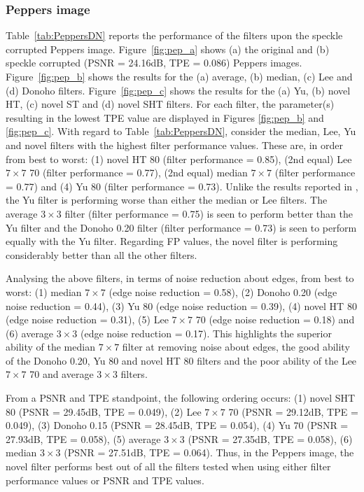 \documentclass[12pt]{report}
\begin{document}
\subsubsection{Peppers image}
Table~\ref{tab:PeppersDN} reports the performance of the filters upon the speckle corrupted Peppers image.
Figure~\ref{fig:pep_a} shows (a) the original and (b) speckle corrupted (PSNR = 24.16dB, TPE = 0.086) Peppers images.
Figure~\ref{fig:pep_b} shows the results for the (a) average, (b) median, (c) Lee and (d) Donoho filters. 
Figure~\ref{fig:pep_c} shows the results for the (a) Yu, (b) novel HT, (c) novel ST and (d) novel SHT filters.
For each filter, the parameter(s) resulting in the lowest TPE value are displayed in Figures \ref{fig:pep_b} and \ref{fig:pep_c}.
With regard to Table~\ref{tab:PeppersDN}, consider the median, Lee, Yu and novel filters with the highest
filter performance values. These are, in order from best to worst: (1) novel HT 80 (filter performance = 0.85), (2nd equal) Lee $7 \times 7$ 70 
(filter performance = 0.77),
(2nd equal) median $7 \times 7$ (filter performance = 0.77) and (4) Yu 80 (filter performance = 0.73). 
Unlike the results reported in \cite{yu96}, the Yu
filter is performing worse than either the median or Lee filters. The average $3 \times 3$ filter (filter performance = 0.75) is seen
to perform better than the Yu filter and the Donoho 0.20 filter (filter performance = 0.73) is seen to perform equally with the Yu filter.
Regarding FP values, the novel filter is performing considerably better than all the other filters.

Analysing the above filters, in terms of noise reduction about edges, from best to worst: 
(1) median $7 \times 7$ (edge noise reduction = 0.58), 
(2) Donoho 0.20 (edge noise reduction = 0.44),
(3) Yu 80 (edge noise reduction = 0.39),
(4) novel HT 80 (edge noise reduction = 0.31),
(5) Lee $7 \times 7$ 70 (edge noise reduction = 0.18) and
(6) average $3 \times 3$ (edge noise reduction = 0.17).
This highlights the superior ability of the median  $7 \times 7$ filter at removing noise about edges, the
good ability of the Donoho 0.20, Yu 80 and novel HT 80 filters and the poor ability of the  Lee $7 \times 7$ 70 
and average $3 \times 3$ filters.

From a PSNR and TPE standpoint, the following ordering occurs:
(1) novel SHT 80 (PSNR = 29.45dB, TPE = 0.049),
(2) Lee $7 \times 7$ 70 (PSNR = 29.12dB, TPE = 0.049),
(3) Donoho 0.15 (PSNR = 28.45dB, TPE = 0.054),
(4) Yu 70 (PSNR = 27.93dB, TPE = 0.058),
(5) average $3 \times 3$ (PSNR = 27.35dB, TPE = 0.058),
(6) median $3 \times 3$ (PSNR = 27.51dB, TPE = 0.064).
Thus, in the Peppers image, the novel filter performs best out of all the filters tested when using either filter
performance values or PSNR and TPE values.
\end{document}
